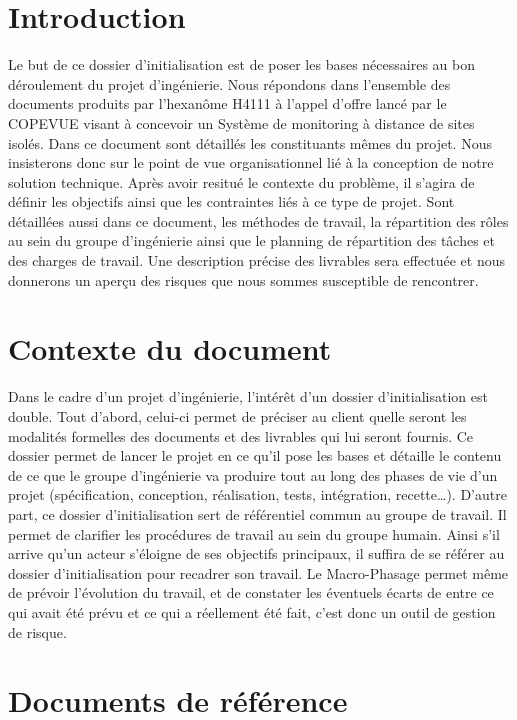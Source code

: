 

\section{Introduction}

Le but de ce dossier d'initialisation est de poser les bases nécessaires au bon déroulement du projet d'ingénierie. Nous répondons dans l'ensemble des documents produits par l'hexanôme H4111 à l'appel d'offre lancé par le COPEVUE visant à concevoir un Système de monitoring à distance de sites isolés. Dans ce document sont détaillés les constituants mêmes du projet. Nous insisterons donc sur le point de vue organisationnel lié à la conception de notre solution technique. Après avoir resitué le contexte du problème, il s'agira de définir les objectifs ainsi que les contraintes liés à ce type de projet. Sont détaillées aussi dans ce document, les méthodes de travail, la répartition des rôles au sein du groupe d'ingénierie ainsi que le planning de répartition des tâches et des charges de travail. Une description précise des livrables sera effectuée et nous donnerons un aperçu des risques que nous sommes susceptible de rencontrer.

\section{Contexte du document}

Dans le cadre d'un projet d'ingénierie, l'intérêt d'un dossier d'initialisation est double. Tout d'abord, celui-ci permet de préciser au client quelle seront les modalités formelles des documents et des livrables qui lui seront fournis. Ce dossier permet de lancer le projet en ce qu'il pose les bases et détaille le contenu de ce que le groupe d'ingénierie va produire tout au long des phases de vie d'un projet (spécification, conception, réalisation, tests, intégration, recette…). D'autre part, ce dossier d'initialisation sert de référentiel commun au groupe de travail. Il permet de clarifier les procédures de travail au sein du groupe humain. Ainsi s'il arrive qu'un acteur s'éloigne de ses objectifs principaux, il suffira de se référer au dossier d'initialisation pour recadrer son travail. Le Macro-Phasage permet même de prévoir l'évolution du travail, et de constater les éventuels écarts de entre ce qui avait été prévu et ce qui a réellement été fait, c'est donc un outil de gestion de risque.

\section{Documents de référence}

